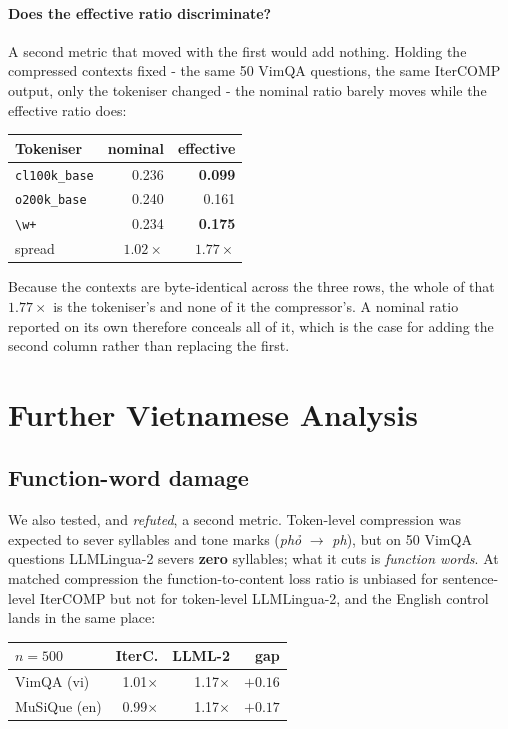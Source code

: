 \documentclass[11pt]{article}
\begin{document}
\paragraph{Does the effective ratio discriminate?} A second metric that moved
with the first would add nothing. Holding the compressed contexts fixed - the
same 50 VimQA questions, the same IterCOMP output, only the tokeniser changed -
the nominal ratio barely moves while the effective ratio does:

\begin{center}
\small
\begin{tabular}{lrr}
\toprule
Tokeniser & nominal & effective \\
\midrule
\texttt{cl100k\_base} & 0.236 & \textbf{0.099} \\
\texttt{o200k\_base} & 0.240 & 0.161 \\
\texttt{\textbackslash w+} & 0.234 & \textbf{0.175} \\
\midrule
spread & $1.02\times$ & $\mathbf{1.77\times}$ \\
\bottomrule
\end{tabular}
\end{center}

Because the contexts are byte-identical across the three rows, the whole of that
$1.77\times$ is the tokeniser's and none of it the compressor's. A nominal ratio
reported on its own therefore conceals all of it, which is the case for adding
the second column rather than replacing the first.

\section{Further Vietnamese Analysis}

\subsection{Function-word damage}
\label{app:funcwords}

We also tested, and \emph{refuted}, a second metric. Token-level compression was
expected to sever syllables and tone marks (\emph{ph\h{o}} $\to$ \emph{ph}), but
on 50 VimQA questions LLMLingua-2 severs \textbf{zero} syllables; what it cuts is
\emph{function words}. At matched compression the function-to-content loss ratio
is unbiased for sentence-level IterCOMP but not for token-level LLMLingua-2, and
the English control lands in the same place:

\begin{center}
\small
\begin{tabular}{lrrr}
\toprule
$n{=}500$ & IterC. & LLML-2 & gap \\
\midrule
VimQA (vi) & 1.01$\times$ & 1.17$\times$ & $+0.16$ \\
MuSiQue (en) & 0.99$\times$ & 1.17$\times$ & $+0.17$ \\
\bottomrule
\end{tabular}
\end{center}
\end{document}
